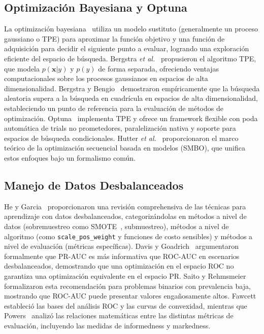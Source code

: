 \documentclass[journal]{IEEEtran}
\begin{document}
\subsection{Optimización Bayesiana y Optuna}
La optimización bayesiana~\cite{snoek2012} utiliza un modelo sustituto (generalmente un proceso gaussiano o TPE) para aproximar la función objetivo y una función de adquisición para decidir el siguiente punto a evaluar, logrando una exploración eficiente del espacio de búsqueda. Bergstra \textit{et al.}~\cite{bergstra2011} propusieron el algoritmo TPE, que modela $p(\mathbf{x}|y)$ y $p(y)$ de forma separada, ofreciendo ventajas computacionales sobre los procesos gaussianos en espacios de alta dimensionalidad. Bergstra y Bengio~\cite{bergstra2012} demostraron empíricamente que la búsqueda aleatoria supera a la búsqueda en cuadrícula en espacios de alta dimensionalidad, estableciendo un punto de referencia para la evaluación de métodos de optimización. Optuna~\cite{akiba2019} implementa TPE y ofrece un framework flexible con poda automática de trials no prometedores, paralelización nativa y soporte para espacios de búsqueda condicionales. Hutter \textit{et al.}~\cite{hutter2011} proporcionaron el marco teórico de la optimización secuencial basada en modelos (SMBO), que unifica estos enfoques bajo un formalismo común.

\subsection{Manejo de Datos Desbalanceados}
He y Garcia~\cite{he2009} proporcionaron una revisión comprehensiva de las técnicas para aprendizaje con datos desbalanceados, categorizándolas en métodos a nivel de datos (sobremuestreo como SMOTE~\cite{chawla2002}, submuestreo), métodos a nivel de algoritmo (como \texttt{scale\_pos\_weight} y funciones de costo sensibles) y métodos a nivel de evaluación (métricas específicas). Davis y Goadrich~\cite{davis2006} argumentaron formalmente que PR-AUC es más informativa que ROC-AUC en escenarios desbalanceados, demostrando que una optimización en el espacio ROC no garantiza una optimización equivalente en el espacio PR. Saito y Rehmsmeier~\cite{saito2015} formalizaron esta recomendación para problemas binarios con prevalencia baja, mostrando que ROC-AUC puede presentar valores engañosamente altos. Fawcett~\cite{fawcett2006} estableció las bases del análisis ROC y las curvas de convexidad, mientras que Powers~\cite{powers2011} analizó las relaciones matemáticas entre las distintas métricas de evaluación, incluyendo las medidas de informedness y markedness.
\end{document}
